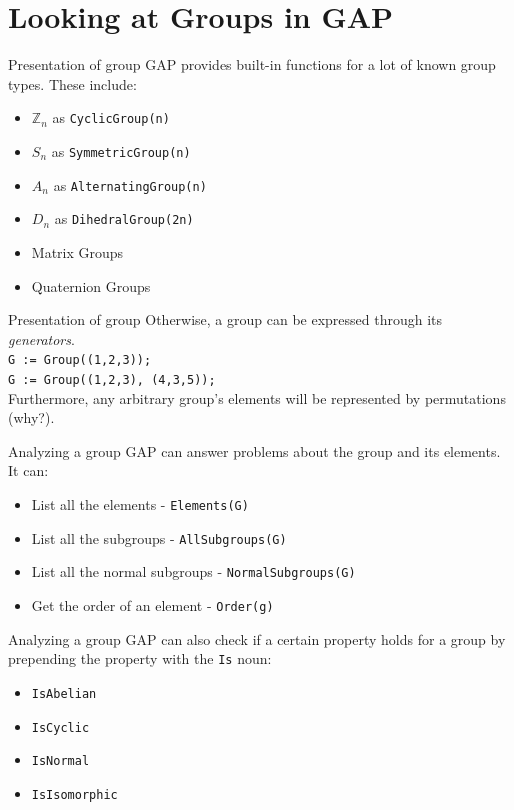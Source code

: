 \documentclass{beamer}
\begin{document}
\section{Looking at Groups in GAP}
\begin{frame}[fragile]{Presentation of group}
    GAP provides built-in functions for a lot of known group types. These include:
    \begin{itemize}
        \item $\mathbb{Z}_n$ as \verb|CyclicGroup(n)|
        \item $S_n$ as \verb|SymmetricGroup(n)|
        \item $A_n$ as \verb|AlternatingGroup(n)|
        \item $D_n$ as \verb|DihedralGroup(2n)|
        \item Matrix Groups 
        \item Quaternion Groups 
    \end{itemize}
\end{frame}
\begin{frame}[fragile]{Presentation of group}
    Otherwise, a group can be expressed through its \textit{generators}. \\ \pause
    \verb|G := Group((1,2,3));| \\ \pause
    \verb|G := Group((1,2,3), (4,3,5));| \\ \pause
    Furthermore, any arbitrary group's elements will be represented by permutations (why?).
\end{frame}
\begin{frame}[fragile]{Analyzing a group}
    GAP can answer problems about the group and its elements. It can:
    \begin{itemize}
        \item List all the elements - \verb|Elements(G)|
        \item List all the subgroups - \verb|AllSubgroups(G)|
        \item List all the normal subgroups - \verb|NormalSubgroups(G)|
        \item Get the order of an element - \verb|Order(g)|
    \end{itemize}
\end{frame}
\begin{frame}[fragile]{Analyzing a group}
    GAP can also check if a certain property holds for a group by prepending the property with the \verb|Is| noun:
    \begin{itemize}
        \item  \verb|IsAbelian|
        \item  \verb|IsCyclic|
        \item  \verb|IsNormal|
        \item  \verb|IsIsomorphic|
    \end{itemize}
\end{frame}
\end{document}
